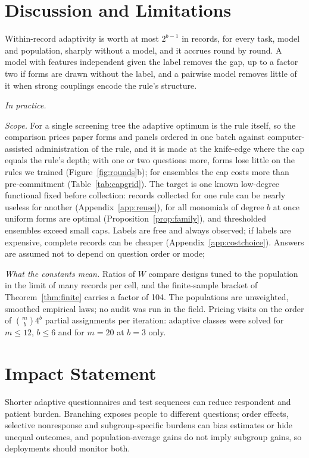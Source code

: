 \documentclass{article}
\begin{document}
\section{Discussion and Limitations}\label{sec:discussion}
Within-record adaptivity is worth at most $2^{b-1}$ in records, for every task, model and population, sharply without a model, and it accrues round by round. A model with features independent given the label removes the gap, up to a factor two if forms are drawn without the label, and a pairwise model removes little of it when strong couplings encode the rule's structure. \nDiscussionSentence

\emph{In practice.} \nPracticeSentence

\emph{Scope.} For a single screening tree the adaptive optimum is the rule itself, so the comparison prices paper forms and panels ordered in one batch against computer-assisted administration of the rule, and it is made at the knife-edge where the cap equals the rule's depth; with one or two questions more, forms lose little on the rules we trained (Figure~\ref{fig:rounds}b); for ensembles the cap costs more than pre-commitment (Table~\ref{tab:capgrid}). The target is one known low-degree functional fixed before collection: records collected for one rule can be nearly useless for another (Appendix~\ref{app:reuse}), for all monomials of degree $b$ at once uniform forms are optimal (Proposition~\ref{prop:family}), and thresholded ensembles exceed small caps. Labels are free and always observed; if labels are expensive, complete records can be cheaper (Appendix~\ref{app:costchoice}). Answers are assumed not to depend on question order or mode; \nOrderSentence{}

\emph{What the constants mean.} Ratios of $W$ compare designs tuned to the population in the limit of many records per cell, and the finite-sample bracket of Theorem~\ref{thm:finite} carries a factor of 104. The populations are unweighted, smoothed empirical laws; no audit was run in the field. Pricing visits on the order of $\binom mb4^b$ partial assignments per iteration: adaptive classes were solved for $m\le12$, $b\le6$ and for $m=20$ at $b=3$ only.

\section*{Impact Statement}
Shorter adaptive questionnaires and test sequences can reduce respondent and patient burden. Branching exposes people to different questions; order effects, selective nonresponse and subgroup-specific burdens can bias estimates or hide unequal outcomes, and population-average gains do not imply subgroup gains, so deployments should monitor both.



\clearpage
\onecolumn
\raggedbottom
\appendix
{}

\end{document}
